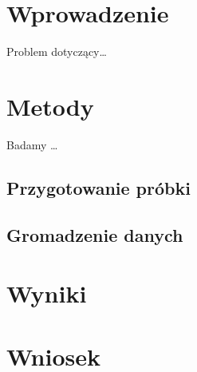 \documentclass{article}
\begin{document}
\section{Wprowadzenie}

Problem dotyczący\ldots

\section{Metody}

Badamy \ldots

\subsection{Przygotowanie próbki}

\subsection{Gromadzenie danych}

\section{Wyniki}

\section{Wniosek}
\end{document}
